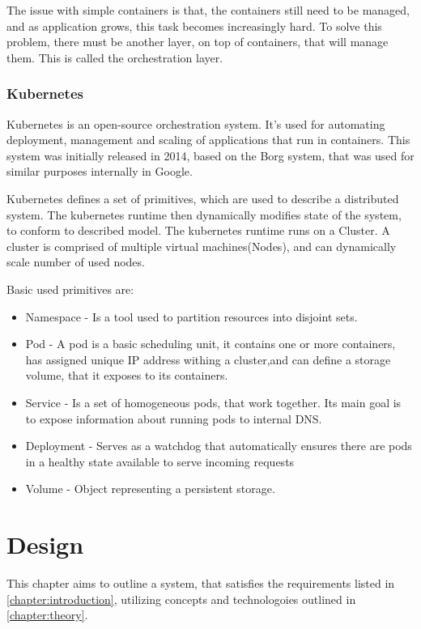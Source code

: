 The issue with simple containers is that, the containers still need to be managed, and as application
grows, this task becomes increasingly hard. To solve this problem, there must be another layer, on top of containers,
that will manage them. This is called the orchestration layer.

\subsection{Kubernetes}

Kubernetes\cite{web:k8s} is an open-source orchestration system. It's used for automating
deployment, management and scaling of applications that run in containers. This system was initially released in 2014,
based on the Borg\cite{borg} system, that was used for similar purposes internally in Google.

Kubernetes defines a set of primitives, which are used to describe a distributed system. The kubernetes
runtime then dynamically modifies state of the system, to conform to described model. The kubernetes runtime
runs on a Cluster. A cluster is comprised of multiple virtual machines(Nodes), and can dynamically scale number
of used nodes.

Basic used primitives are:
\begin{itemize}
    \item Namespace - Is a tool used to partition resources into disjoint sets.
    \item Pod - A pod is a basic scheduling unit, it contains one or more containers, has assigned unique IP address
    withing a cluster,and can define a storage volume, that it exposes to its containers.
    \item Service - Is a set of homogeneous pods, that work together. Its main goal is to expose information about running
    pods to internal DNS.
    \item Deployment - Serves as a watchdog that automatically ensures there are pods in a healthy state available to
    serve incoming requests
    \item Volume - Object representing a persistent storage.
\end{itemize}


\chapter{Design}
\label{chapter:design}

This chapter aims to outline a system, that satisfies the requirements listed in \autoref{chapter:introduction}, utilizing
concepts and technologoies outlined in \autoref{chapter:theory}.


